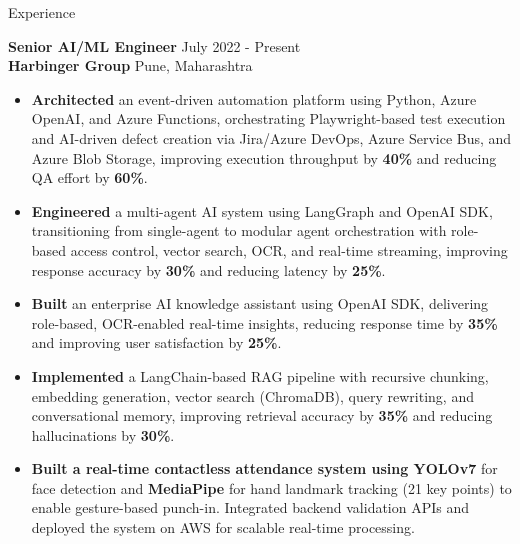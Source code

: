 \documentclass{resume} %
\begin{document}

\begin{rSection}{Experience}

\textbf{Senior AI/ML Engineer} \hfill July 2022 - Present\\
\textbf{Harbinger Group} \hfill Pune, Maharashtra
\begin{itemize}
    \itemsep -0.5em

    \item \textbf{Architected} an event-driven automation platform using Python, Azure OpenAI, and Azure Functions, orchestrating Playwright-based test execution and AI-driven defect creation via Jira/Azure DevOps, Azure Service Bus, and Azure Blob Storage, improving execution throughput by \textbf{40\%} and reducing QA effort by \textbf{60\%}.

    \item \textbf{Engineered} a multi-agent AI system using LangGraph and OpenAI SDK, transitioning from single-agent to modular agent orchestration with role-based access control, vector search, OCR, and real-time streaming, improving response accuracy by \textbf{30\%} and reducing latency by \textbf{25\%}.

    \item \textbf{Built} an enterprise AI knowledge assistant using OpenAI SDK, delivering role-based, OCR-enabled real-time insights, reducing response time by \textbf{35\%} and improving user satisfaction by \textbf{25\%}.

    \item \textbf{Implemented} a LangChain-based RAG pipeline with recursive chunking, embedding generation, vector search (ChromaDB), query rewriting, and conversational memory, improving retrieval accuracy by \textbf{35\%} and reducing hallucinations by \textbf{30\%}.

    \item \textbf{Built a real-time contactless attendance system using YOLOv7} for face detection and \textbf{MediaPipe} for hand landmark tracking (21 key points) to enable gesture-based punch-in. Integrated backend validation APIs and deployed the system on AWS for scalable real-time processing.

\end{itemize}

\end{rSection}
\end{document}
